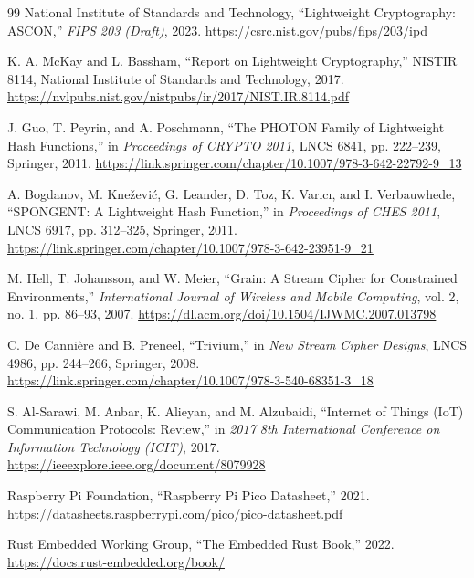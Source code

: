 \documentclass[12pt]{report}
\begin{document}
\begin{thebibliography}{99}
    National Institute of Standards and Technology, ``Lightweight Cryptography: ASCON,'' \textit{FIPS 203 (Draft)}, 2023.
    \url{https://csrc.nist.gov/pubs/fips/203/ipd}

    K. A. McKay and L. Bassham, ``Report on Lightweight Cryptography,'' NISTIR 8114, National Institute of Standards and Technology, 2017.
    \url{https://nvlpubs.nist.gov/nistpubs/ir/2017/NIST.IR.8114.pdf}

    J. Guo, T. Peyrin, and A. Poschmann, ``The PHOTON Family of Lightweight Hash Functions,'' in \textit{Proceedings of CRYPTO 2011}, LNCS 6841, pp. 222--239, Springer, 2011.
    \url{https://link.springer.com/chapter/10.1007/978-3-642-22792-9_13}

    A. Bogdanov, M. Knežević, G. Leander, D. Toz, K. Varıcı, and I. Verbauwhede, ``SPONGENT: A Lightweight Hash Function,'' in \textit{Proceedings of CHES 2011}, LNCS 6917, pp. 312--325, Springer, 2011.
    \url{https://link.springer.com/chapter/10.1007/978-3-642-23951-9_21}

    M. Hell, T. Johansson, and W. Meier, ``Grain: A Stream Cipher for Constrained Environments,'' \textit{International Journal of Wireless and Mobile Computing}, vol. 2, no. 1, pp. 86--93, 2007.
    \url{https://dl.acm.org/doi/10.1504/IJWMC.2007.013798}

    C. De Cannière and B. Preneel, ``Trivium,'' in \textit{New Stream Cipher Designs}, LNCS 4986, pp. 244--266, Springer, 2008.
    \url{https://link.springer.com/chapter/10.1007/978-3-540-68351-3_18}

    S. Al-Sarawi, M. Anbar, K. Alieyan, and M. Alzubaidi, ``Internet of Things (IoT) Communication Protocols: Review,'' in \textit{2017 8th International Conference on Information Technology (ICIT)}, 2017.
    \url{https://ieeexplore.ieee.org/document/8079928}

    Raspberry Pi Foundation, ``Raspberry Pi Pico Datasheet,'' 2021.
    \url{https://datasheets.raspberrypi.com/pico/pico-datasheet.pdf}

    Rust Embedded Working Group, ``The Embedded Rust Book,'' 2022.
    \url{https://docs.rust-embedded.org/book/}

\end{thebibliography}
\end{document}
